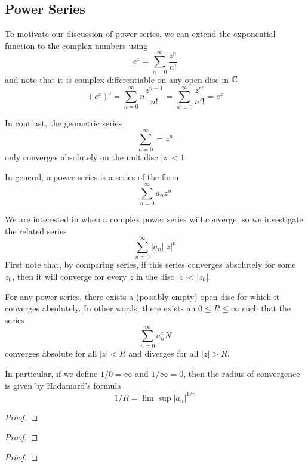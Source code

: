 \subsection{Power Series}
To motivate our discussion of power series, we can extend the exponential function to the complex numbers using
\[ e^z = \sum_{n=0}^\infty \frac{z^n}{n!} \]
and note that it is complex differentiable on any open disc in $\mathbb{C}$
\[ (e^z)' = \sum_{n = 0}^\infty n \frac{z^{n-1}}{n!} = \sum_{n' = 0}^\infty \frac{z^{n'}}{n'!} = e^z \]

In contrast, the geometric series
\[ \sum_{n=0}^\infty = z^n \]
only converges absolutely on the unit disc $|z| < 1$.

\begin{definition}
	In general, a power series is a series of the form
	\[ \sum_{n = 0}^\infty a_n z^n \]
\end{definition}

We are interested in when a complex power series will converge, so we investigate the related series 
\[ \sum_{n = 0}^\infty |a_n| |z|^n \]
First note that, by comparing series, if this series converges absolutely for some $z_0$, then it will converge for every $z$ in the disc $|z| < |z_0|$.

\begin{theorem}
	For any power series, there exists a (possibly empty) open disc for which it converges absolutely. In other words, there exists an $0 \leq R \leq \infty$ such that the series
	\[ \sum_{n = 0}^\infty a_n ^zN\]
	converges absolute for all $|z| < R$ and diverges for all $|z| > R$.
	
	In particular, if we define $1/0 = \infty$ and $1/\infty = 0$, then the radius of convergence is given by Hadamard's formula
	\[ 1/R = \lim \sup |a_n|^{1/n} \]
\end{theorem}
\begin{proof}

\end{proof}

\newpage 
\begin{theorem}

\end{theorem}
\begin{proof}

\end{proof}

\begin{corollary}

\end{corollary}
\begin{proof}

\end{proof}

